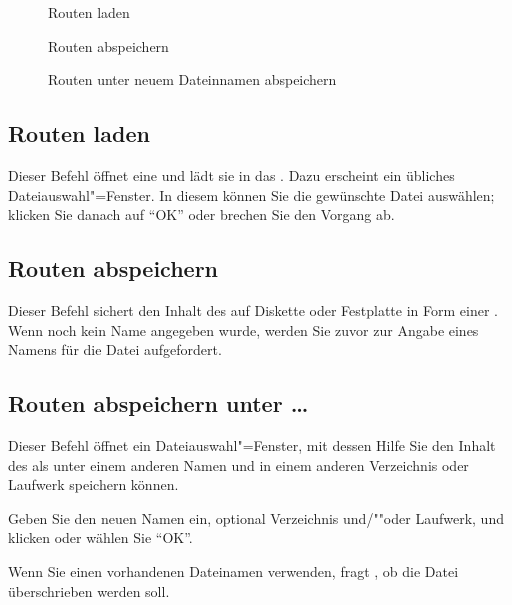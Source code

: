 \begin{description}
\item[] Routen laden
\item[] Routen abspeichern
\item[] Routen unter neuem
  Dateinnamen abspeichern
\end{description}


\subsection{Routen laden}\label{sec:MI_ROUTELOAD}


Dieser Befehl öffnet eine  
und lädt sie in das . Dazu erscheint 
ein übliches Dateiauswahl"=Fenster. In diesem können Sie die 
gewünschte Datei auswählen; klicken Sie danach auf "`OK"' oder 
brechen Sie den Vorgang ab.



\subsection{Routen abspeichern}\label{sec:MI_ROUTESAVE}



Dieser Befehl sichert den Inhalt des  
auf Diskette oder Festplatte in Form einer . 
Wenn noch kein Name angegeben wurde, werden Sie zuvor zur Angabe 
eines Namens für die Datei aufgefordert.



\subsection{Routen abspeichern unter \dots}\label{sec:MI_ROUTESAVEAS}



Dieser Befehl öffnet ein Dateiauswahl"=Fenster, mit dessen Hilfe Sie
den Inhalt des  als
 unter einem anderen Namen
und in einem anderen Verzeichnis oder Laufwerk speichern können.


Geben Sie den neuen Namen ein, optional Verzeichnis und/""oder 
Laufwerk, und klicken oder wählen Sie "`OK"'.


Wenn Sie einen vorhandenen Dateinamen verwenden, fragt \mutabor{}, 
ob die Datei überschrieben werden soll. 



